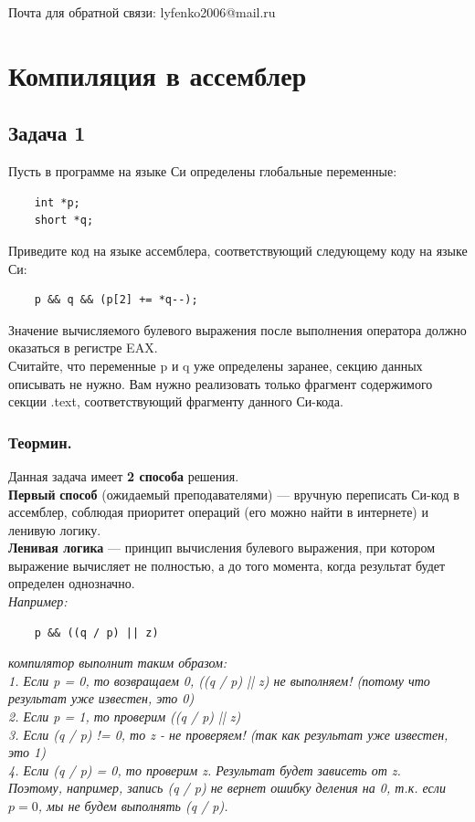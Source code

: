 \documentclass[12pt, letterpaper]{article}
\begin{document}
Почта для обратной связи: lyfenko2006@mail.ru
\newpage
\section{Компиляция в ассемблер}
\subsection{Задача 1}
Пусть в программе на языке Си определены глобальные переменные:
\begin{verbatim}
    int *p;
    short *q;
\end{verbatim}
Приведите код на языке ассемблера, соответствующий следующему коду на языке Си:
\begin{verbatim}
    p && q && (p[2] += *q--);
\end{verbatim}
Значение вычисляемого булевого выражения после выполнения оператора должно оказаться в регистре EAX.\\
Считайте, что переменные p и q уже определены заранее, секцию данных описывать не нужно. Вам нужно реализовать только фрагмент содержимого секции .text, соответствующий фрагменту данного Си-кода.\\
\subsubsection{Теормин.}
Данная задача имеет \textbf{2 способа} решения.\\

\textbf{Первый} \textbf{способ} (ожидаемый преподавателями) — вручную переписать Си-код в ассемблер, соблюдая приоритет операций (его можно найти в интернете) и ленивую логику.\\

\textbf{Ленивая логика} — принцип вычисления булевого выражения, при котором выражение вычисляет не полностью, а до того момента, когда результат будет определен однозначно.\\

\textit{Например:}
\begin{verbatim}
    p && ((q / p) || z)
\end{verbatim}
\textit{компилятор выполнит таким образом:\\
1. Если p = 0, то возвращаем 0, ((q / p) || z) не выполняем! (потому что результат уже известен, это 0)\\
2. Если p = 1, то проверим ((q / p) || z)\\
3. Если (q / p) != 0, то z - не проверяем! (так как результат уже известен, это 1)\\
4. Если (q / p) = 0, то проверим z. Результат будет зависеть от z.\\
Поэтому, например, запись (q / p) не вернет ошибку деления на 0, т.к. если $p = 0$, мы не будем выполнять (q / p).}\\
\end{document}
